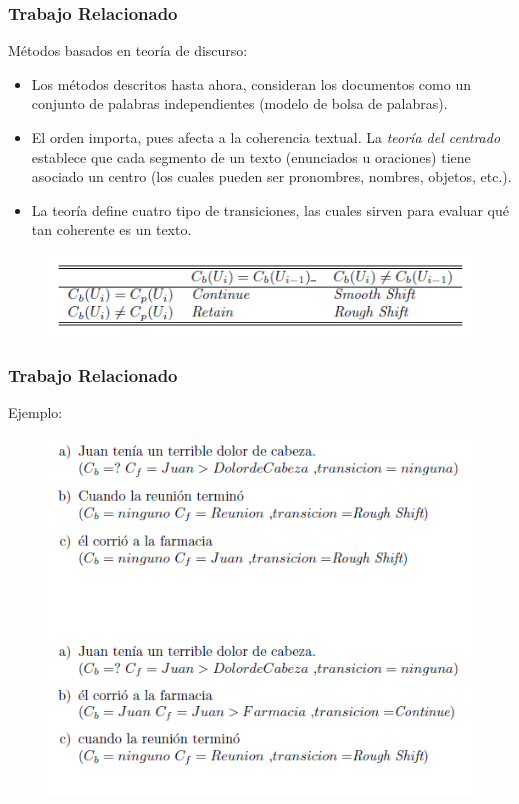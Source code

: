 \documentclass{beamer}
\begin{document}
\begin{frame}
\frametitle{Trabajo Relacionado}

Métodos basados en teoría de discurso:
\begin{itemize}
\item Los métodos descritos hasta ahora, consideran los documentos como un conjunto de palabras independientes (modelo de bolsa de palabras).
\item El orden importa, pues afecta a la coherencia textual. La {\em teoría del centrado} establece que cada segmento de un texto (enunciados u oraciones) tiene asociado un centro (los cuales pueden ser pronombres, nombres, objetos, etc.).
\item La teoría define cuatro tipo de transiciones, las cuales sirven para evaluar qué tan coherente es un texto.
\end{itemize}

\begin{figure}
\includegraphics[width=0.5\linewidth]{fig2.png}
\end{figure}

\end{frame}


\begin{frame}
\frametitle{Trabajo Relacionado}
Ejemplo:
\begin{figure}
\includegraphics[width=0.5\linewidth]{fig3.png}
\end{figure}

\end{frame}

\end{document}
